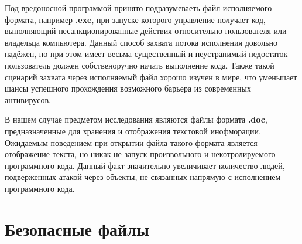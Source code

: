 Под вредоносной программой принято подразумеваеть файл исполняемого формата, например \textbf{.exe}, при запуске которого управление получает код, выполняющий несанкционированные действия относительно пользователя или владельца компьютера. 
Данный способ захвата потока исполнения довольно надёжен, но при этом имеет весьма существенный и неустранимый недостаток -- пользователь должен собственоручно начать выполнение кода.
Также такой сценарий захвата через исполняемый файл хорошо изучен в мире, что уменьшает шансы успешного прохождения возможного барьера из современных антивирусов.

В нашем случае предметом исследования являются файлы формата \textbf{.doc}, предназначенные для хранения и отображения текстовой инофморации. 
Ожидаемым поведением при открытии файла такого формата является отображение текста, но никак не запуск произвольного и некотролируемого программного кода.
Данный факт значительно увеличивает количество людей, подверженных атакой через объекты, не связанных напрямую с исполнением программного кода.

\section{Безопасные файлы}